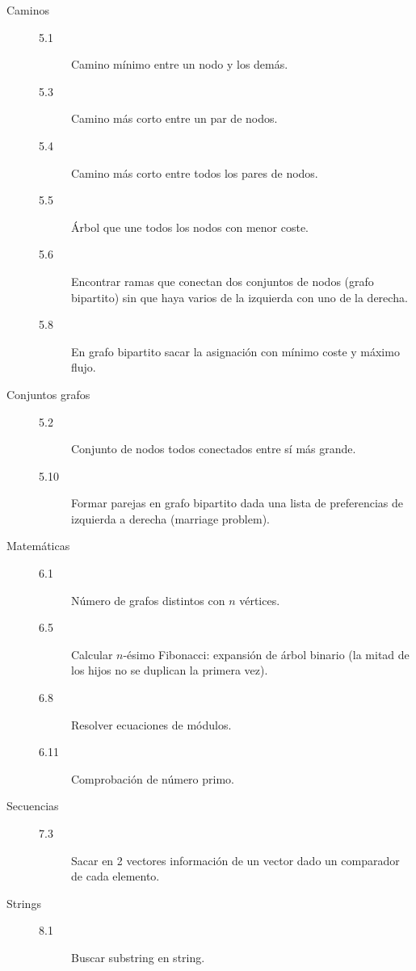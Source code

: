\begin{description}
	\item [Caminos]
	\begin{description}
		\item []
		\item [5.1] Camino mínimo entre un nodo y los demás.
		\item [5.3] Camino más corto entre un par de nodos.
		\item [5.4] Camino más corto entre todos los pares de nodos.
		\item [5.5] Árbol que une todos los nodos con menor coste.
		\item [5.6] Encontrar ramas que conectan dos conjuntos de nodos (grafo bipartito) sin que haya varios de la izquierda con uno de la derecha.
		\item [5.8] En grafo bipartito sacar la asignación con mínimo coste y máximo flujo.
	\end{description}
	\item [Conjuntos grafos]
	\begin{description}
		\item []
		\item [5.2] Conjunto de nodos todos conectados entre sí más grande.
		\item [5.10] Formar parejas en grafo bipartito dada una lista de preferencias de izquierda a derecha (marriage problem).
	\end{description}
	\item [Matemáticas]
	\begin{description}
		\item []
		\item [6.1] Número de grafos distintos con $n$ vértices.
		\item [6.5] Calcular $n$-ésimo Fibonacci: expansión de árbol binario (la mitad de los hijos no se duplican la primera vez).
		\item [6.8] Resolver ecuaciones de módulos.
		\item [6.11] Comprobación de número primo.
	\end{description}
	\item [Secuencias]
	\begin{description}
		\item []
		\item [7.3] Sacar en 2 vectores información de un vector dado un comparador de cada elemento.
	\end{description}
	\item [Strings]
	\begin{description}
		\item []
		\item [8.1] Buscar substring en string.
	\end{description}
\end{description}